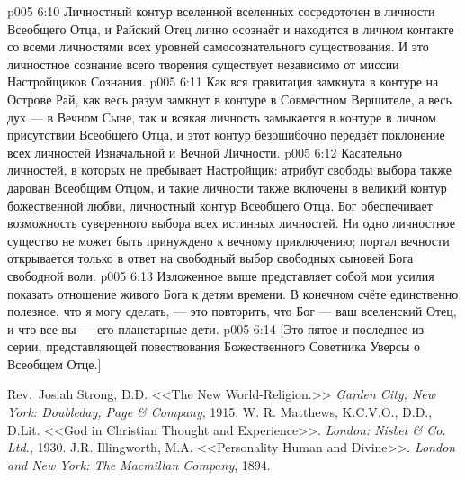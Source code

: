 \vs p005 6:10 \pc Личностный контур вселенной вселенных сосредоточен в личности Всеобщего Отца, и Райский Отец лично осознаёт и находится в личном контакте со всеми личностями всех уровней самосознательного существования. И это личностное сознание всего творения существует независимо от миссии Настройщиков Сознания.
\vs p005 6:11 \pc Как вся гравитация замкнута в контуре на Острове Рай, как весь разум замкнут в контуре в Совместном Вершителе, а весь дух --- в Вечном Сыне, так и всякая личность замыкается в контуре в личном присутствии Всеобщего Отца, и этот контур безошибочно передаёт поклонение всех личностей Изначальной и Вечной Личности.
\vs p005 6:12 \pc Касательно личностей, в которых не пребывает Настройщик: атрибут свободы выбора также дарован Всеобщим Отцом, и такие личности также включены в великий контур божественной любви, личностный контур Всеобщего Отца. Бог обеспечивает возможность суверенного выбора всех истинных личностей. Ни одно личностное существо не может быть принуждено к вечному приключению; портал вечности открывается только в ответ на свободный выбор свободных сыновей Бога свободной воли.
\vs p005 6:13 \pc Изложенное выше представляет собой мои усилия показать отношение живого Бога к детям времени. В конечном счёте единственно полезное, что я могу сделать, --- это повторить, что Бог --- ваш вселенский Отец, и что все вы --- его планетарные дети.
\vsetoff
\vs p005 6:14 [Это пятое и последнее из серии, представляющей повествования Божественного Советника Уверсы о Всеобщем Отце.]
\quizlink
\begin{thebibliography}{100}
Rev.~Josiah Strong, D.D.
{<<The New World\hyp{}Religion.>>}
{\em Garden City, New York: Doubleday, Page \& Company}, 1915.
W. R. Matthews, K.C.V.O., D.D., D.Lit.
{<<God in Christian Thought and Experience>>.}
{\em London: Nisbet \& Co. Ltd.}, 1930.
J.R. Illingworth, M.A.
{<<Personality Human and Divine>>.}
{\em London and New York: The Macmillan Company}, 1894.
\end{thebibliography}
